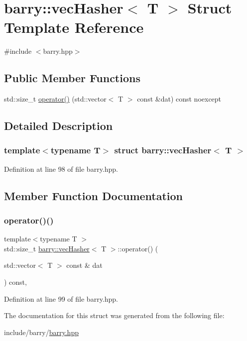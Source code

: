 \hypertarget{structbarry_1_1vec_hasher}{}\section{barry\+:\+:vec\+Hasher$<$ T $>$ Struct Template Reference}
\label{structbarry_1_1vec_hasher}


{\ttfamily \#include $<$barry.\+hpp$>$}

\subsection*{Public Member Functions}
\begin{DoxyCompactItemize}
\item 
std\+::size\+\_\+t \hyperlink{structbarry_1_1vec_hasher_ada8dea483f4fc12f469e161b2fd09225}{operator()} (std\+::vector$<$ T $>$ const \&dat) const noexcept
\end{DoxyCompactItemize}


\subsection{Detailed Description}
\subsubsection*{template$<$typename T$>$\newline
struct barry\+::vec\+Hasher$<$ T $>$}



Definition at line 98 of file barry.\+hpp.



\subsection{Member Function Documentation}
\mbox{\label{structbarry_1_1vec_hasher_ada8dea483f4fc12f469e161b2fd09225}} 
\subsubsection{\texorpdfstring{operator()()}{operator()()}}
{\footnotesize\ttfamily template$<$typename T $>$ \\
std\+::size\+\_\+t \hyperlink{structbarry_1_1vec_hasher}{barry\+::vec\+Hasher}$<$ T $>$\+::operator() (\begin{DoxyParamCaption}\item[{std\+::vector$<$ T $>$ const \&}]{dat }\end{DoxyParamCaption}) const\hspace{0.3cm}{\ttfamily [inline]}, {\ttfamily [noexcept]}}



Definition at line 99 of file barry.\+hpp.



The documentation for this struct was generated from the following file\+:\begin{DoxyCompactItemize}
\item 
include/barry/\hyperlink{barry_8hpp}{barry.\+hpp}\end{DoxyCompactItemize}
